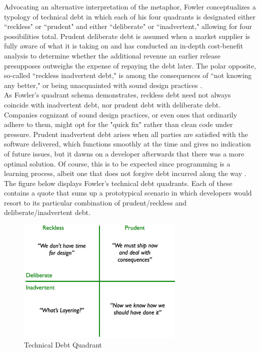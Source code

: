 Advocating an alternative interpretation of the metaphor, Fowler \cite{fowler} conceptualizes a typology of technical debt in which each of his four quadrants is designated either ``reckless" or ``prudent" and either ``deliberate" or ``inadvertent," allowing for four possibilities total. Prudent deliberate debt is assumed when a market supplier is fully aware of what it is taking on and has conducted an in-depth cost-benefit analysis to determine whether the additional revenue an earlier release presupposes outweighs the expense of repaying the debt later. The polar opposite, so-called ``reckless inadvertent debt," is among the consequences of ``not knowing any better," or being unacquainted with sound design practices \cite{fowler}.\\

As Fowler's quadrant schema demonstrates, reckless debt need not always coincide with inadvertent debt, nor prudent debt with deliberate debt. Companies cognizant of sound design practices, or even ones that ordinarily adhere to them, might opt for the "quick fix" rather than clean code under pressure. Prudent inadvertent debt arises when all parties are satisfied with the software delivered, which functions smoothly at the time and gives no indication of future issues, but it dawns on a developer afterwards that there was a more optimal solution. Of course, this is to be expected since programming is a learning process, albeit one that does not forgive debt incurred along the way \cite{fowler}.\\

The figure below displays Fowler's technical debt quadrants. Each of these contains a quote that sums up a prototypical scenario in which developers would resort to its particular combination of prudent/reckless and deliberate/inadvertent debt.

\begin{figure}[t]
	\centering
	\includegraphics[width=80mm]{figures/chapter2/technicalDebtQuadrant}
	\caption{Technical Debt Quadrant}
	\label{fig:technical_debt_quadrant}
\end{figure}

